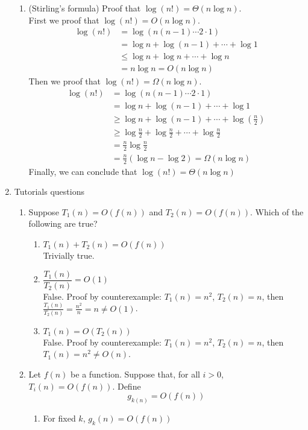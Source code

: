 \documentclass[11pt]{article}
\begin{document}
\begin{enumerate}
\begin{enumerate}
\item (Stirling's formula) Proof that $\log(n!) = \Theta (n \log n)$.\\
First we proof that $\log (n!) = O(n \log n)$.
\begin{align*}
\log (n!) &= \log (n (n-1) \cdots 2 \cdot 1)\\ 
&= \log n + \log (n-1) + \cdots + \log 1 \\
&\leq \log n + \log n + \cdots + \log n \\
&= n \log n = O(n \log n)
\end{align*}
Then we proof that $\log (n!) = \Omega (n \log n)$.
\begin{align*}
\log (n!) &= \log (n (n-1) \cdots 2 \cdot 1)\\ 
&= \log n + \log (n-1) + \cdots + \log 1 \\
&\geq \log n + \log (n-1) + \cdots + \log (\frac{n}{2}) \\
&\geq \log \frac{n}{2} + \log \frac{n}{2} + \cdots + \log \frac{n}{2}\\
&= \frac{n}{2} \log \frac{n}{2}\\
&= \frac{n}{2} (\log n -\log 2) = \Omega(n \log n)
\end{align*}
Finally, we can conclude that $\log (n!) = \Theta (n \log n)$
\end{enumerate}
\item Tutorials questions
\begin{enumerate}
\item Suppose $T_1 (n)= O(f(n))$ and $T_2 (n) = O(f(n))$. Which of the following are true?
\begin{enumerate}
\item $T_1 (n) + T_2 (n) = O(f(n))$\\
Trivially true.
\item $\dfrac{T_1 (n)}{T_2 (n)} = O(1)$\\
False. Proof by counterexample: $T_1 (n) = n^2$, $T_2 (n) = n$, then $\frac{T_1 (n)}{T_2 (n)}= \frac{n^2}{n} = n \neq O(1)$.
\item $T_1 (n) = O(T_2 (n))$\\
False. Proof by counterexample: $T_1 (n) = n^2$, $T_2 (n) = n$, then $T_1 (n) = n^2 \neq O(n)$.
\end{enumerate}
\item Let $f(n)$ be a function. Suppose that, for all $i > 0$, $T_i (n) = O(f(n))$. Define $$g_{k(n)}= O(f(n))$$
\begin{enumerate}
\item For fixed $k$, $g_k (n)= O(f(n))$\\

\end{enumerate}
\end{enumerate}
\end{enumerate}
\end{document}
